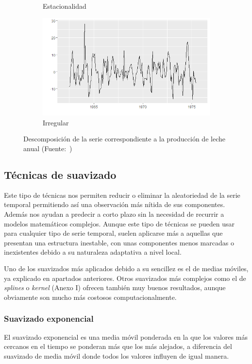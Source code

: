 \begin{figure} [t]
\begin{subfigure}{.5\textwidth}
  \caption{Estacionalidad}
  \label{fig:sfig1}
\end{subfigure}
\begin{subfigure}{.5\textwidth}
  \centering
  \includegraphics[width=.8\linewidth]{Images/Conceptos/random.png}
  \caption{Irregular}
  \label{fig:sfig2}
\end{subfigure}
\caption{Descomposición de la serie correspondiente a la producción de leche anual (Fuente:~\protect{})}
\label{decomp}
\end{figure}


\subsection{Técnicas de suavizado}

Este tipo de técnicas nos permiten reducir o eliminar la aleatoriedad de la serie temporal permitiendo así una observación más nítida de sus componentes. Además nos ayudan a  predecir a corto plazo sin la necesidad de recurrir a modelos matemáticos complejos. Aunque este tipo de técnicas se pueden usar para cualquier tipo de serie temporal, suelen aplicarse más a aquellas que presentan una estructura inestable, con unas componentes menos marcadas o inexistentes debido a su naturaleza adaptativa a nivel local.

Uno de los suavizados más aplicados debido a su sencillez es el de medias móviles, ya explicado en apartados anteriores. Otros suavizados más complejos como el de \textit{splines} o \textit{kernel} (Anexo I) ofrecen también muy buenos resultados, aunque obviamente son mucho más costosos computacionalmente.

\subsubsection{Suavizado exponencial}
El suavizado exponencial es una media móvil ponderada en la que los valores más cercanos en el tiempo se ponderan más que los más alejados, a diferencia del suavizado de media móvil donde todos los valores influyen de igual manera.

